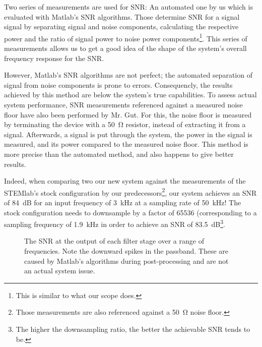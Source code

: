 Two series of measurements  are used for SNR: An automated one  by us which is
evaluated  with Matlab's  SNR  algorithms. Those determine  SNR  for a  signal
signal by separating  signal and noise components,  calculating the respective
power and the ratio of signal power to noise power components\footnote{%
    This is similar to what our scope does.%
}.
This series of measurements  allows us to get a good idea of  the shape of the
system's overall frequency response for the SNR.

However, Matlab's SNR algorithms are  not perfect; the automated separation of
signal from  noise components  is prone  to errors. Consequencly,  the results
achieved by  this method are  below the system's true  capabilities. To assess
actual  system performance,  SNR  measurements referenced  against a  measured
noise floor have also been performed  by Mr. Gut. For this, the noise floor is
measured by terminating  the device with a \SI{50}{\ohm}  resistor, instead of
extracting it from  a signal. Afterwards, a signal is put  through the system,
the power in  the signal is measured,  and its power compared  to the measured
noise floor. This method  is more precise than the automated  method, and also
happens to give better results.

Indeed, when comparing two 
our new system against the measurements of the STEMlab's
stock configuration by our predecessors\footnote{%
    Those  measurements  are also  referenced  against  a \SI{50}{\ohm}  noise
    floor.%
}, our system achieves an SNR of \SI{84}{\dB} for an input frequency of \SI{3}{\kHz}
at a sampling rate of \SI{50}{\kHz}! The stock configuration needs to downsample
by a factor of \num{65536} (corresponding to a sampling frequency of \SI{1.9}{\kHz}
in order to achieve an SNR of \SI{83.5}{\dB}\footnote{%
    The higher the downsampling ratio, the  better the achievable SNR tends to
be.%
}.

\begin{figure}
    \centering
    
    \caption[SNR at Filter Outputs]{%
        The  SNR  at  the  output  of  each  filter  stage  over  a  range  of
        frequencies.   Note the  downward  spikes in  the passband. These  are
        caused by  Matlab's algorithms during  post-processing and are  not an
        actual system issue.%
    }
    \label{fig:verification:snrAll}
\end{figure}

